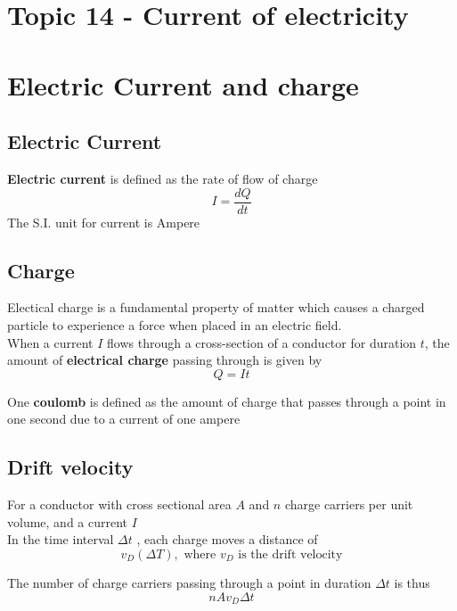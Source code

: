 \documentclass[a4paper, 10pt]{article}
\begin{document}
\section*{Topic 14 - Current of electricity}

\section{Electric Current and charge}

\subsection{Electric Current}
\begin{framed}
   \textbf{Electric current} is defined as the rate of flow of charge
   \[
   I = \frac{dQ}{dt}
   \]
   The S.I. unit for current is Ampere
\end{framed}	

\subsection{Charge}
\begin{framed}
   Electical charge is a fundamental property of matter which causes a charged particle to experience a force when placed in an electric field. \\

   When a current $I$ flows through a cross-section of a conductor for duration $t$, the amount of \textbf{electrical charge} passing through is given by
   \[
   Q = It
   \]

   One \textbf{coulomb} is defined as the amount of charge that passes through a point in one second due to a current of one ampere
   
\end{framed}	

\subsection{Drift velocity}
For a conductor with cross sectional area $A$ and $n$ charge carriers per unit volume, and a current $I$ \\

In the time interval $\Delta t$ , each charge moves a distance of
\[
   v_D( \Delta T), \text{ where $v_D$ is the drift velocity}
\]

The number of charge carriers passing through a point in duration $\Delta t$ is thus
\[
nA v_D \Delta t
\]
\end{document}
